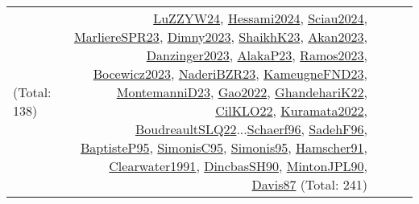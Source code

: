{\begin{longtable}{p{3cm}r>{\raggedright\arraybackslash}p{6cm}>{\raggedright\arraybackslash}p{6cm}>{\raggedright\arraybackslash}p{8cm}}
(Total: 138) & \hyperref[detail:LuZZYW24]{LuZZYW24}, \hyperref[detail:Hessami2024]{Hessami2024}, \hyperref[detail:Sciau2024]{Sciau2024}, \hyperref[detail:MarliereSPR23]{MarliereSPR23}, \hyperref[detail:Dimny2023]{Dimny2023}, \hyperref[detail:ShaikhK23]{ShaikhK23}, \hyperref[detail:Akan2023]{Akan2023}, \hyperref[detail:Danzinger2023]{Danzinger2023}, \hyperref[detail:AlakaP23]{AlakaP23}, \hyperref[detail:Ramos2023]{Ramos2023}, \hyperref[detail:Bocewicz2023]{Bocewicz2023}, \hyperref[detail:NaderiBZR23]{NaderiBZR23}, \hyperref[detail:KameugneFND23]{KameugneFND23}, \hyperref[detail:MontemanniD23]{MontemanniD23}, \hyperref[detail:Gao2022]{Gao2022}, \hyperref[detail:GhandehariK22]{GhandehariK22}, \hyperref[detail:CilKLO22]{CilKLO22}, \hyperref[detail:Kuramata2022]{Kuramata2022}, \hyperref[detail:BoudreaultSLQ22]{BoudreaultSLQ22}...\hyperref[detail:Schaerf96]{Schaerf96}, \hyperref[detail:SadehF96]{SadehF96}, \hyperref[detail:BaptisteP95]{BaptisteP95}, \hyperref[detail:SimonisC95]{SimonisC95}, \hyperref[detail:Simonis95]{Simonis95}, \hyperref[detail:Hamscher91]{Hamscher91}, \hyperref[detail:Clearwater1991]{Clearwater1991}, \hyperref[detail:DincbasSH90]{DincbasSH90}, \hyperref[detail:MintonJPL90]{MintonJPL90}, \hyperref[detail:Davis87]{Davis87} (Total: 241)\\

\end{longtable}}
